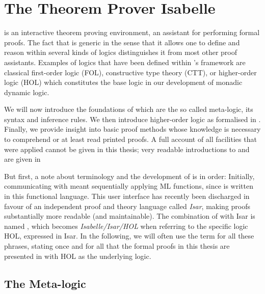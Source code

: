 
\chapter{The Theorem Prover Isabelle}
\label{cha:isabelle}

\Isabelle is an interactive theorem proving environment, \IE an assistant for
performing formal proofs. The fact that \Isabelle is generic in the sense that
it allows one to define and reason within several kinds of logics distinguishes
it from most other proof assistants. Examples of logics that have been defined
within \Isabelle's framework are classical first-order logic (FOL), constructive
type theory (CTT), or higher-order logic (HOL) which constitutes
the base logic in our development of monadic dynamic logic.

We will now introduce the foundations of \Isabelle which are the so called
meta-logic, its syntax and inference rules. We then introduce higher-order logic
as formalised in \Isabelle. Finally, we provide insight into basic proof methods
whose knowledge is necessary to comprehend or at least read printed \Isabelle
proofs. A full account of all facilities that were applied cannot be given in
this thesis; very readable introductions to \Isabelle and \IsabelleIsar are
given in \cite{Nipkow03,IsabelleHOL}

But first, a note about terminology and the development of \Isabelle is in
order: Initially, communicating with \Isabelle meant sequentially applying ML
functions, since \Isabelle is written in this functional language. This user
interface has recently been discharged in favour of an independent proof and
theory language called \emph{Isar}, making proofs substantially more readable
(and maintainable). The combination of \Isabelle with Isar is named
\IsabelleIsar, which becomes \textit{Isabelle/Isar/HOL} when referring to the
specific logic HOL, expressed in Isar. In the following, we will often use the
term \Isabelle for all these phrases, stating once and for all that the formal
proofs in this thesis are presented in \IsabelleIsar with HOL as the underlying
logic.


\section{The Meta-logic}
\label{sec:meta-logic}

